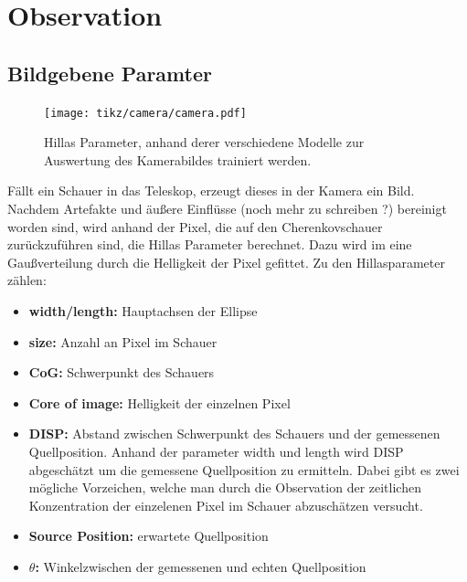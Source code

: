 \chapter{Observation}
\section{Bildgebene Paramter}
\begin{figure}[H]
  \centering
  \texttt{[image: tikz/camera/camera.pdf]}
  \caption{Hillas Parameter, anhand derer verschiedene Modelle zur Auswertung des Kamerabildes trainiert werden.}
\end{figure}
Fällt ein Schauer in das Teleskop, erzeugt dieses in der Kamera ein Bild. Nachdem Artefakte und äußere Einflüsse (noch mehr zu schreiben ?) bereinigt worden sind, wird anhand der Pixel, die auf den Cherenkovschauer zurückzuführen sind, die Hillas Parameter berechnet. 
Dazu wird im eine Gaußverteilung durch die Helligkeit der Pixel gefittet. 
Zu den Hillasparameter zählen:
\begin{itemize}
  \item \textbf{width/length:} Hauptachsen der Ellipse
  \item \textbf{size:} Anzahl an Pixel im Schauer
  \item \textbf{CoG:} Schwerpunkt des Schauers
  \item \textbf{Core of image:} Helligkeit der einzelnen Pixel
  \item \textbf{DISP:} Abstand zwischen Schwerpunkt des Schauers und der gemessenen Quellposition. Anhand der parameter width und length wird DISP abgeschätzt um die gemessene Quellposition zu ermitteln. Dabei gibt es zwei mögliche Vorzeichen, welche man durch die Observation der zeitlichen Konzentration der einzelenen Pixel im Schauer abzuschätzen versucht.
  \item \textbf{Source Position:} erwartete Quellposition
  \item \textbf{$\theta$:} Winkelzwischen der gemessenen und echten Quellposition
\end{itemize}
